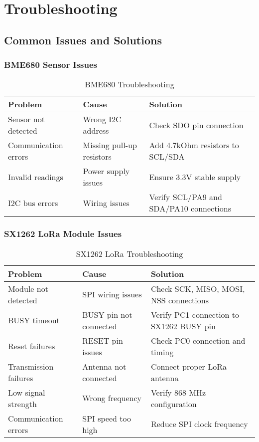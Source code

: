 \documentclass[11pt,a4paper]{article}
\begin{document}
\section{Troubleshooting}

\subsection{Common Issues and Solutions}

\subsubsection{BME680 Sensor Issues}
\begin{table}[h]
\centering
\begin{tabular}{|l|l|l|}
\hline
\textbf{Problem} & \textbf{Cause} & \textbf{Solution} \\
\hline
Sensor not detected & Wrong I2C address & Check SDO pin connection \\
\hline
Communication errors & Missing pull-up resistors & Add 4.7kOhm resistors to SCL/SDA \\
\hline
Invalid readings & Power supply issues & Ensure 3.3V stable supply \\
\hline
I2C bus errors & Wiring issues & Verify SCL/PA9 and SDA/PA10 connections \\
\hline
\end{tabular}
\caption{BME680 Troubleshooting}
\end{table}

\subsubsection{SX1262 LoRa Module Issues}
\begin{table}[h]
\centering
\begin{tabular}{|l|l|l|}
\hline
\textbf{Problem} & \textbf{Cause} & \textbf{Solution} \\
\hline
Module not detected & SPI wiring issues & Check SCK, MISO, MOSI, NSS connections \\
\hline
BUSY timeout & BUSY pin not connected & Verify PC1 connection to SX1262 BUSY pin \\
\hline
Reset failures & RESET pin issues & Check PC0 connection and timing \\
\hline
Transmission failures & Antenna not connected & Connect proper LoRa antenna \\
\hline
Low signal strength & Wrong frequency & Verify 868 MHz configuration \\
\hline
Communication errors & SPI speed too high & Reduce SPI clock frequency \\
\hline
\end{tabular}
\caption{SX1262 LoRa Troubleshooting}
\end{table}
\end{document}
